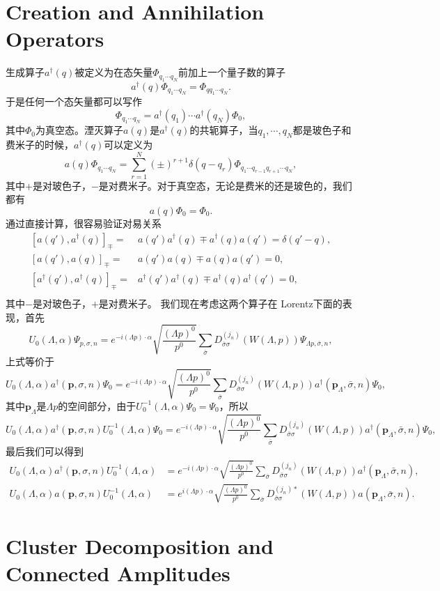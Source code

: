 \section{Creation and Annihilation Operators}
生成算子$a^\dag(q)$被定义为在态矢量$\Phi_{q_1 \cdots q_N}$前加上一个量子数的算子
\[
	a^\dag(q)\Phi_{q_1 \cdots q_N}=\Phi_{qq_1 \cdots q_N}.
\]
于是任何一个态矢量都可以写作
\[
	\Phi_{q_1 \cdots q_N}=a^\dag(q_1)\cdots a^\dag(q_N)\Phi_0,
\]
其中$\Phi_0$为真空态。湮灭算子$a(q)$是$a^\dag(q)$的共轭算子，当$q_1,\cdots,q_N$都是玻色子和费米子的时候，$a^\dag(q)$可以定义为
\[
	a(q)\Phi_{q_1\cdots q_N}=\sum_{r=1}^N(\pm)^{r+1}\delta(q-q_r)\Phi_{q_1\cdots q_{r-1}q_{r+1}\cdots q_N},
\]
其中$+$是对玻色子，$-$是对费米子。对于真空态，无论是费米的还是玻色的，我们都有
\[
	a(q)\Phi_0=\Phi_0.
\]
通过直接计算，很容易验证对易关系
\[
\begin{split}
	[a(q'),a^\dag(q)]_\mp=&a(q')a^\dag(q)\mp a^\dag(q)a(q')=\delta(q'-q),\\
	[a(q'),a(q)]_\mp=&a(q')a(q)\mp a(q)a(q')=0,\\
	[a^\dag(q'),a^\dag(q)]_\mp=&a^\dag(q')a^\dag(q)\mp a^\dag(q)a^\dag(q')=0,\\
\end{split}
\]
其中$-$是对玻色子，$+$是对费米子。
我们现在考虑这两个算子在	Lorentz下面的表现，首先
\[
U_0(\Lambda,\alpha)\Psi_{p,\sigma,n}=e^{-i(\Lambda p)\cdot \alpha}\sqrt{\frac{(\Lambda p)^0}{p^0}}\sum_{\bar{\sigma}} D^{(j_n)}_{\bar{\sigma}\sigma}(W(\Lambda,p))\Psi_{\Lambda p,\bar{\sigma},n},
\]
上式等价于
\[
U_0(\Lambda,\alpha)a^\dag(\mathbf{p},\sigma,n)\Psi_0=e^{-i(\Lambda p)\cdot \alpha}\sqrt{\frac{(\Lambda p)^0}{p^0}}\sum_{\bar{\sigma}} D^{(j_n)}_{\bar{\sigma}\sigma}(W(\Lambda,p))a^\dag(\mathbf{p}_\Lambda,\bar{\sigma},n)\Psi_0,
\]
其中$\mathbf{p}_\Lambda$是$\Lambda p$的空间部分，由于$U^{-1}_0(\Lambda,\alpha)\Psi_0=\Psi_0$，所以
\[
	U_0(\Lambda,\alpha)a^\dag(\mathbf{p},\sigma,n)U^{-1}_0(\Lambda,\alpha)\Psi_0=e^{-i(\Lambda p)\cdot \alpha}\sqrt{\frac{(\Lambda p)^0}{p^0}}\sum_{\bar{\sigma}} D^{(j_n)}_{\bar{\sigma}\sigma}(W(\Lambda,p))a^\dag(\mathbf{p}_\Lambda,\bar{\sigma},n)\Psi_0,
\]
最后我们可以得到
\[
\begin{split}
	U_0(\Lambda,\alpha)a^\dag(\mathbf{p},\sigma,n)U_0^{-1}(\Lambda,\alpha)&=e^{-i(\Lambda p)\cdot \alpha}\sqrt{\frac{(\Lambda p)^0}{p^0}}\sum_{\bar{\sigma}} D^{(j_n)}_{\bar{\sigma}\sigma}\left(W(\Lambda,p)\right)a^\dag(\mathbf{p}_\Lambda,\bar{\sigma},n),\\
	U_0(\Lambda,\alpha)a(\mathbf{p},\sigma,n)U_0^{-1}(\Lambda,\alpha)&=e^{i(\Lambda p)\cdot \alpha}\sqrt{\frac{(\Lambda p)^0}{p^0}}\sum_{\bar{\sigma}} D^{(j_n)*}_{\bar{\sigma}\sigma}\left(W(\Lambda,p)\right)a(\mathbf{p}_\Lambda,\bar{\sigma},n).
\end{split}
\]


\section{Cluster Decomposition and Connected Amplitudes}



